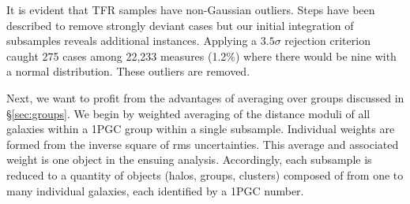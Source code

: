 \documentclass[twocolumn]{aastex63}
\newcommand{\kms}{\mbox{${\rm km~s^{-1}}$}}
\begin{document}
It is evident that TFR samples have non-Gaussian outliers. Steps have been described to remove strongly deviant cases but our initial integration of subsamples reveals additional instances.  Applying a $3.5\sigma$ rejection criterion caught 275 cases among 22,233 measures (1.2\%) where there would be nine with a normal distribution. These outliers are removed.


Next, we want to profit from the advantages of averaging over groups discussed in \S \ref{sec:groups}.  We begin by weighted averaging of the distance moduli of all galaxies within a 1PGC group within a single subsample.  Individual weights are formed from the inverse square of rms uncertainties. This average and associated weight is one object in the ensuing analysis. 
Accordingly, each subsample is reduced to a quantity of objects (halos, groups, clusters) composed of from one to many individual galaxies, each identified by a 1PGC number.


\end{document}
